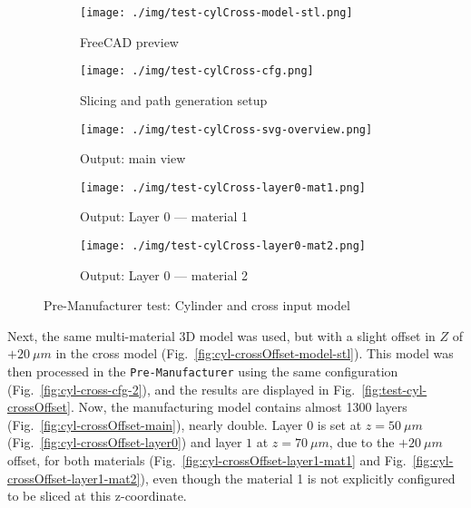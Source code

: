 \begin{figure}[htbp!]
  \centering
  \begin{subfigure}[t]{1.0\textwidth}
  \centering
  \texttt{[image: ./img/test-cylCross-model-stl.png]}
  \caption{FreeCAD preview}%
  \label{fig:cyl-cross-model-stl}
  \end{subfigure}
%
  \begin{subfigure}[t]{0.48\textwidth}
  \centering
  \texttt{[image: ./img/test-cylCross-cfg.png]}
  \caption{Slicing and path generation setup}%
  \label{fig:cyl-cross-cfg}
\end{subfigure}
%
  \begin{subfigure}[t]{0.48\textwidth}
  \centering
  \texttt{[image: ./img/test-cylCross-svg-overview.png]}
  \caption{Output: main view}%
  \label{fig:cyl-cross-main}
\end{subfigure}
%
  \begin{subfigure}[t]{0.48\textwidth}
  \centering
  \texttt{[image: ./img/test-cylCross-layer0-mat1.png]}
  \caption{Output: Layer 0 --- material 1}%
  \label{fig:cyl-cross-layer0-mat1}
\end{subfigure}
%
  \begin{subfigure}[t]{0.48\textwidth}
  \centering
  \texttt{[image: ./img/test-cylCross-layer0-mat2.png]}
  \caption{Output: Layer 0 --- material 2}%
  \label{fig:cyl-cross-layer0-mat2}
\end{subfigure}
%
  \caption{Pre-Manufacturer test: Cylinder and cross input model}%
  \label{fig:test-cyl-cross}
\end{figure}

Next, the same multi-material 3D model was used, but with a slight offset in $Z$
of $+20~\mu m$ in the cross model (Fig.~\ref{fig:cyl-crossOffset-model-stl}).
This model was then processed in the \texttt{Pre-Manufacturer} using the same
configuration (Fig.~\ref{fig:cyl-cross-cfg-2}), and the results are
displayed in Fig.~\ref{fig:test-cyl-crossOffset}.
Now, the manufacturing model contains almost 1300 layers (Fig.~\ref{fig:cyl-crossOffset-main}), nearly double. Layer
$0$ is set at $z = 50~\mu m$ (Fig.~\ref{fig:cyl-crossOffset-layer0}) and layer
$1$ at $z = 70~\mu m$, due to the $+20~\mu m$ offset, for both materials
(Fig.~\ref{fig:cyl-crossOffset-layer1-mat1} and
Fig.~\ref{fig:cyl-crossOffset-layer1-mat2}), even though the material 1 is not
explicitly configured to be sliced at this z-coordinate.

